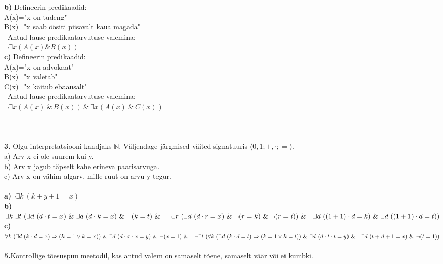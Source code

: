 \documentclass{article}
\begin{document}
\textbf{b)} Defineerin predikaadid:\\
\null\quad\quad A(x)="x on tudeng"\\
\null\quad\quad B(x)="x saab \"o\"ositi piisavalt kaua magada"\\
\null\quad\ Antud lause predikaatarvutuse valemina:\\
\null\quad\quad $\neg\exists x(A(x)\&B(x))$\\
\textbf{c)} Defineerin predikaadid:\\
\null\quad\quad A(x)="x on advokaat"\\
\null\quad\quad B(x)="x valetab"\\
\null\quad\quad C(x)="x k\"aitub ebaausalt"\\
\null\quad\ Antud lause predikaatarvutuse valemina:\\
\null\quad\quad $\neg\exists x(A(x)\ \&\ B(x))\ \&\ \exists x(A(x)\ \&\ C(x))$\\\\\\\\
\textbf{3.} Olgu interpretatsiooni kandjaks $\mathbb{N}$. V\"aljendage j\"argmised v\"aited signatuuris $\langle0,1;+,\cdot;=\rangle$.\\
a) Arv x ei ole suurem kui y.\\
b) Arv x jagub t\"apselt kahe erineva paarisarvuga.\\
c) Arv x on v\"ahim algarv, mille ruut on arvu y tegur.\\\\
\textbf{a)}$\neg\exists k\ (k+y+1=x)$\\
\textbf{b)}$\exists k\ \exists t\ (\exists d\ (d\cdot t=x)\ \&\ \exists d\ (d\cdot k=x)\ \&\ \neg(k=t)\ \&\\ \null\quad \neg\exists r\ (\exists d\ (d\cdot r=x)\ \&\ \neg(r=k)\ \&\ \neg(r=t))\ \&\\\null\quad \exists d\ ((1+1)\cdot d=k)\ \&\ \exists d\ ((1+1)\cdot d=t))$\\
\textbf{c)}$\forall k\ (\exists d\ (k\cdot d=x)\Rightarrow (k=1\vee k=x))\ \&\ \exists d\ (d\cdot x\cdot x=y)\ \&\ \neg(x=1)\ \&\\\null\quad \neg\exists t\ (\forall k\ (\exists d\ (k\cdot d=t)\Rightarrow (k=1\vee k=t))\ \&\ \exists d\ (d\cdot t\cdot t=y)\ \&\\\null\quad \exists d\ (t+d+1=x)\ \&\ \neg(t=1))$\\\\
\textbf{5.}Kontrollige t\~oesuspuu meetodil, kas antud valem on samaselt t\~oene, samaselt v\"a\"ar v\~oi ei kumbki.\\\\
\end{document}
